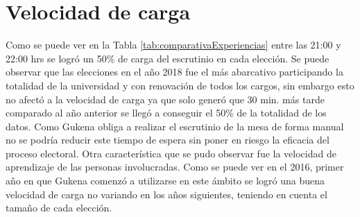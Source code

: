 \section{Velocidad de carga}
Como se puede ver en la Tabla \ref{tab:comparativaExperiencias} entre las 21:00 y 22:00 hrs se logró un 50\% de carga del escrutinio  en cada elección. Se puede observar que las elecciones en el año 2018 fue el más abarcativo participando la totalidad de la universidad y con renovación de todos los cargos, sin embargo esto no afectó a la velocidad de carga ya que solo generó que 30 min. más tarde comparado al año anterior se llegó a conseguir el 50\% de la totalidad de los datos. Como Gukena obliga a realizar el escrutinio de la mesa de forma manual no se podría reducir este tiempo de espera sin poner en riesgo la eficacia del proceso electoral. Otra característica que se pudo observar fue la velocidad de aprendizaje de las personas involucradas. Como se puede ver en el 2016, primer año en que Gukena comenzó a utilizarse en este ámbito se logró una buena velocidad de carga no variando en los años siguientes, teniendo en cuenta el tamaño de cada elección.


